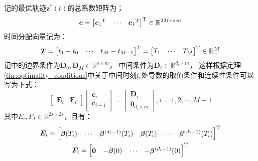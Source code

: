 记的最优轨迹$\bm{z}^*(t)$的总系数矩阵为；
\begin{equation}
  \bm{c} = {
    \begin{bmatrix}
      {\bm{c}_1}^{\text{T}} & \cdots & {\bm{c}_1}^{\text{T}}
    \end{bmatrix}
  }^{\text{T}} \in \mathbb{R}^{2Ms \times m}
  \label{equ:coeff_matrix_of_the_whole_traj} 
\end{equation}
时间分配向量记为：
\begin{equation}
  \bm{T} = {
    \begin{bmatrix}
      t_1 - t_0 & \cdots & t_M - t_{M-1}
    \end{bmatrix}
  }^{\text{T}} = {
    \begin{bmatrix}
      T_1 & \cdots & T_M
    \end{bmatrix}
  }^{\text{T}} \in \mathbb{R}_+^{M}
  \label{equ:time_alloc_vector}
\end{equation}
记中的边界条件为$\bm{D}_0, \bm{D}_M \in \mathbb{R}^{s \times m}$，
中间条件为$\bm{D}_i \in \mathbb{R}^{d_i \times m}$，
这样根据定理\ref{thr:optimality_conditions}中关于中间时刻$t_i$处导数的取值条件和连续性条件可以写为下式：
\begin{equation}
  \begin{bmatrix}
    \bm{E}_i & \bm{F}_i
  \end{bmatrix}
  \begin{bmatrix}
    \bm{c}_i \\ \bm{c}_{i+1}
  \end{bmatrix} =
  \begin{bmatrix}
    \bm{D}_i \\ \textbf{0}_{\bar{d}_i \times m}
  \end{bmatrix}, 
  i = 1, 2, \cdots, M-1
  \label{equ:conditons_at_t_i}
\end{equation}
其中$E_i,F_I \in \mathbb{R}^{2s \times 2s}$，且有：
\begin{gather}
  \bm{E}_i = {
    \begin{bmatrix}
      \bm{\beta}(T_i) & \cdots & \bm{\beta}^{(d_i-1)}(T_i) & \bm{\beta}(T_i) & \cdots & \bm{\beta}^{(\bar{d}_i-1)}(T_i)
    \end{bmatrix}
  }^{\text{T}} \label{equ:E_i}\\
  \bm{F}_i = {
    \begin{bmatrix}
      \textbf{0} & -\bm{\beta}(0) & \cdots & -\bm{\beta}^{(\bar{d}_i-1)}(0)
    \end{bmatrix}
  }^{\text{T}}
  \label{equ:F_i}
\end{gather}
